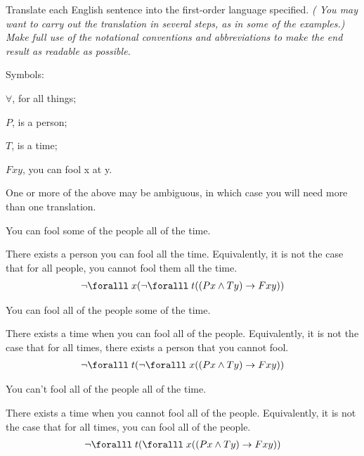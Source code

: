 \setcounter{problem}{4}
\begin{problem}
  Translate each English sentence into the first-order language specified.
  \emph{(
    You may want to carry out the translation in several steps,
    as in some of the examples.) Make full use of the notational
    conventions and abbreviations to make the end result
    as readable as possible.}

    \step
    Symbols:

    \step
    \begin{enumroman}
      \item $\forall$, for all things;
      \item $P$, is a person;
      \item $T$, is a time;
      \item $Fxy$, you can fool x at y.
    \end{enumroman}
    
    \step
    One or more of the above may be ambiguous,
    in which case you will need more than one translation.
  
  \begin{enumalph}
    \item You can fool some of the people all of the time.
      \begin{Answer}
        There exists a person you can fool all the time.
        Equivalently, it is not the case that for all people,
        you cannot fool them all the time.
        \begin{align*}
          \lnot \forall x (\lnot \forall t ((Px \land Ty) \lto Fxy))
        \end{align*}
      \end{Answer}
    \item You can fool all of the people some of the time.
      \begin{Answer}
        There exists a time when you can fool all of the people.
        Equivalently, it is not the case that for all times,
        there exists a person that you cannot fool.
        \begin{align*}
          \lnot \forall t (\lnot \forall x ((Px \land Ty) \lto Fxy))
        \end{align*}
      \end{Answer}
    \item You can’t fool all of the people all of the time.
      \begin{Answer}
        There exists a time when you cannot fool all of the people.
        Equivalently, it is not the case that for all times,
        you can fool all of the people.
        \begin{align*}
          \lnot \forall t (\forall x ((Px \land Ty) \lto Fxy))
        \end{align*}

      \end{Answer}
  \end{enumalph}
\end{problem}
